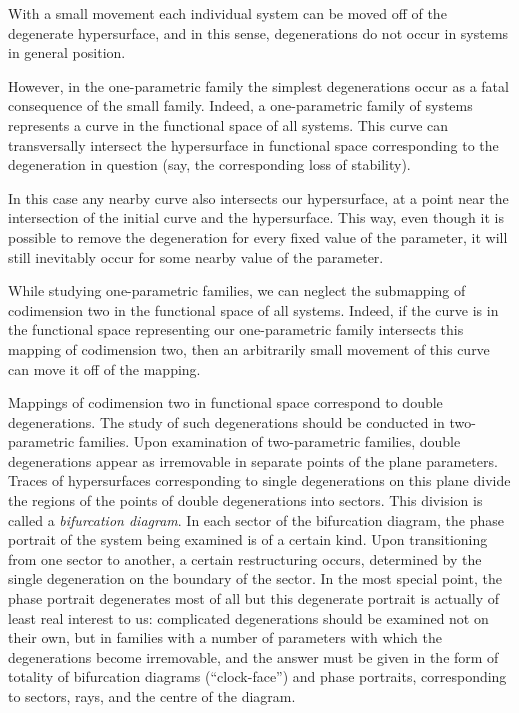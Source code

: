 \documentclass[12pt]{amsart}
\begin{document}
With a small movement each individual system can be moved off of the degenerate
hypersurface, and in this sense, degenerations do not occur in systems in
general position.

However, in the one-parametric family the simplest degenerations occur as a fatal
consequence of the small family.
Indeed, a one-parametric family of systems represents a curve in the functional
space of all systems.
This curve can transversally intersect the hypersurface in functional space
corresponding to the degeneration in question (say, the corresponding loss of
stability).

In this case any nearby curve also intersects our hypersurface, at a point
near the intersection of the initial curve and the hypersurface.
This way, even though it is possible to remove the degeneration for every fixed
value of the parameter, it will still inevitably occur for some nearby value of
the parameter.

While studying one-parametric families, we can neglect the submapping of
codimension two in the functional space of all systems.
Indeed, if the curve is in the functional space representing our one-parametric
family intersects this mapping of codimension two, then an arbitrarily small
movement of this curve can move it off of the mapping.

Mappings of codimension two in functional space correspond to double
degenerations.
The study of such degenerations should be conducted in two-parametric families.
Upon examination of two-parametric families, double degenerations appear as
irremovable in separate points of the plane parameters.
Traces of hypersurfaces corresponding to single degenerations on this plane
divide the regions of the points of double degenerations into sectors.
This division is called a \textit{bifurcation diagram}.
In each sector of the bifurcation diagram, the phase portrait of the system
being examined is of a certain kind.
Upon transitioning from one sector to another, a certain restructuring occurs,
determined by the single degeneration on the boundary of the sector.
In the most special point, the phase portrait degenerates most of all but this
degenerate portrait is actually of least real interest to us: complicated
degenerations should be examined not on their own, but in families with a number
of parameters with which the degenerations become irremovable, and the answer
must be given in the form of totality of bifurcation diagrams (``clock-face'')
and phase portraits, corresponding to sectors, rays, and the centre of the
diagram.
\end{document}
